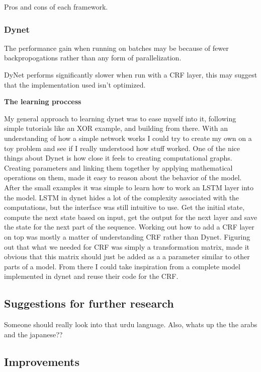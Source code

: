 Pros and cons of each framework.

\subsubsection{Dynet}

The performance gain when running on batches may be because of fewer
backpropogations rather than any form of parallelization.

DyNet performs significantly slower when run with a CRF layer, this may suggest
that the implementation used isn't optimized. 



\textbf{The learning proccess}

My general approach to learning dynet was to ease myself into it, following
simple tutorials like an XOR example, and building from there. With an
understanding of how a simple network works I could try to create my own on a
toy problem and see if I really understood how stuff worked. One of the nice
things about Dynet is how close it feels to creating computational graphs.
Creating parameters and linking them together by applying mathematical
operations on them, made it easy to reason about the behavior of the model.
After the small examples it was simple to learn how to work an LSTM layer into
the model. LSTM in dynet hides a lot of the complexity associated with the
computations, but the interface was still intuitive to use. Get the initial
state, compute the next state based on input, get the output for the next layer
and save the state for the next part of the sequence. Working out how to add a
CRF layer on top was mostly a matter of understanding CRF rather than Dynet.
Figuring out that what we needed for CRF was simply a transformation matrix,
made it obvious that this matrix should just be added as a a parameter similar
to other parts of a model. From there I could take inspiration from a complete
model implemented in dynet and reuse their code for the CRF.


\subsection{Suggestions for further research}

Someone should really look into that urdu language. Also, whats up the the arabs
and the japanese??

\subsection{Improvements}

